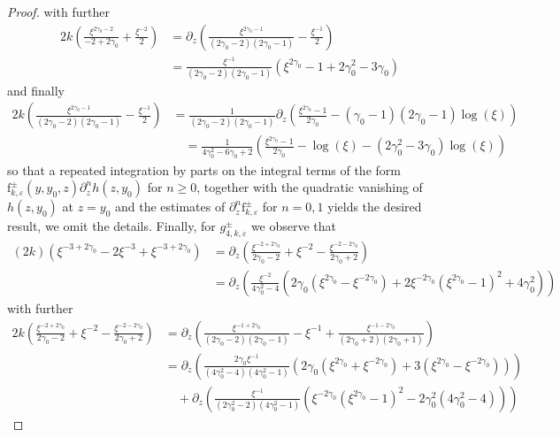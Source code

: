 \documentclass[11pt,reqno]{amsproc}
\theoremstyle{definition}
\numberwithin{equation}{section}
\newcommand{\ep}{\varepsilon}
\begin{document}
\begin{proof}
with further
\begin{align*}
2k \left( \frac{\xi^{2\gamma_0-2}}{-2+2\gamma_0} +\frac{\xi^{-2}}{2} \right) &= \partial_z \left( \frac{\xi^{2\gamma_0-1}}{(2\gamma_0-2)(2\gamma_0-1)} - \frac{\xi^{-1}}{2} \right) \\
&= \frac{\xi^{-1}}{(2\gamma_0-2)(2\gamma_0-1)}\left( \xi^{2\gamma_0} - 1 +2\gamma_0^2-3\gamma_0 \right)
\end{align*}
and finally
\begin{align*}
2k \left( \frac{\xi^{2\gamma_0-1}}{(2\gamma_0-2)(2\gamma_0-1)} - \frac{\xi^{-1}}{2} \right) &= \frac{1}{(2\gamma_0-2)(2\gamma_0-1)} \partial_z \left( \frac{\xi^{2\gamma_0}-1}{2\gamma_0} - (\gamma_0-1)(2\gamma_0-1)\log(\xi) \right) \\
&\quad= \frac{1}{4\gamma_0^2-6\gamma_0+2}\left( \frac{\xi^{2\gamma_0}-1}{2\gamma_0} - \log(\xi) - (2\gamma_0^2-3\gamma_0) \log(\xi) \right)
\end{align*}
so that a repeated integration by parts on the integral terms of the form $\mathrm{f}_{k,\ep}^\pm(y,y_0,z) \partial_z^n h(z,y_0)$ for $n\geq 0$, together with the quadratic vanishing of $h(z,y_0)$ at $z=y_0$ and the estimates of $\partial_z^n\mathrm{f}_{k,\ep}^\pm$ for $n=0,1$ yields the desired result, we omit the details. Finally, for $g_{4,k,\ep}^\pm$ we observe that
\begin{align*}
(2k)\left( \xi^{-3+2\gamma_0} - 2\xi^{-3} + \xi^{-3+2\gamma_0} \right) &= \partial_z \left( \frac{\xi^{-2+2\gamma_0}}{2\gamma_0-2} + \xi^{-2} - \frac{\xi^{-2-2\gamma_0}}{2\gamma_0+2} \right) \\
&=\partial_z \left(\frac{\xi^{-2}}{4\gamma_0^2-4} \left( 2\gamma_0 \left( \xi^{2\gamma_0}- \xi^{-2\gamma_0} \right) + 2\xi^{-2\gamma_0}\left( \xi^{2\gamma_0}-1\right)^2 +4\gamma_0^2 \right) \right)
\end{align*}
with further
\begin{align*}
2k\left( \frac{\xi^{-2+2\gamma_0}}{2\gamma_0-2} + \xi^{-2} - \frac{\xi^{-2-2\gamma_0}}{2\gamma_0+2} \right) &= \partial_z \left( \frac{\xi^{-1+2\gamma_0}}{(2\gamma_0-2)(2\gamma_0-1)}  - \xi^{-1}  + \frac{\xi^{-1-2\gamma_0}}{(2\gamma_0+2)(2\gamma_0+1)} \right) \\
&= \partial_z \left(\frac{2\gamma_0\xi^{-1}}{(4\gamma_0^2-4)(4\gamma_0^2-1)}\left( 2\gamma_0 \left(  \xi^{2\gamma_0} + \xi^{-2\gamma_0} \right)  + 3\left( \xi^{2\gamma_0}-\xi^{-2\gamma_0} \right) \right) \right) \\
&\quad +\partial_z \left( \frac{\xi^{-1}}{(2\gamma_0^2-2)(4\gamma_0^2-1)}\left( \xi^{-2\gamma_0} \left( \xi^{2\gamma_0} -1 \right)^2 - 2\gamma_0^2\left( 4\gamma_0^2 -4 \right) \right) \right)

\end{align*}
\end{proof}
\end{document}
